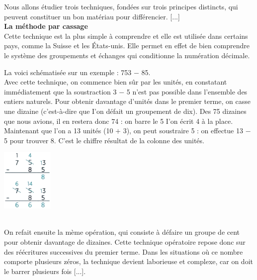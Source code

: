 \begin{center}
   \begin{minipage}{16cm}
      \textsf{Nous allons étudier trois techniques, fondées sur trois principes distincts, qui peuvent constituer un bon matériau pour différencier. [...] \\
      {\bf La méthode par \og cassage \fg} \\
      Cette technique est la plus simple à comprendre et elle est utilisée dans certains pays, comme la Suisse et les États-unis. Elle permet en effet de bien comprendre le système des groupements et échanges qui conditionne la numération décimale.} \\ [2mm]
      \begin{minipage}{13cm}
         \textsf{La voici schématisée sur un exemple : 753 $-$ 85. \\
         Avec cette technique, on commence bien sûr par les unités, en constatant immédiatement que la soustraction 3 $-$ 5 n'est pas possible dans l'ensemble des entiers naturels. Pour obtenir davantage d'unités dans le premier terme, on \og casse \fg{} une dizaine (c'est-à-dire que I'on défait un groupement de dix). Des 75 dizaines que nous avions, il en restera donc 74 : on barre le 5 I'on écrit 4 à la place. Maintenant que l'on a 13 unités (10 $+$ 3), on peut soustraire 5 : on effectue 13 $-$ 5 pour trouver 8. C'est le chiffre résultat de la colonne des unités. \medskip}
      \end{minipage}
      \quad
      \begin{minipage}{2.5cm}
               \includegraphics[width=2.5cm]{Nombres_et_calculs_did/Images/Num3_crpe_cassage}
      \end{minipage} \\
      \textsf{On refait ensuite la mème opération, qui consiste à défaire un groupe de cent pour obtenir davantage de dizaines. Cette technique opératoire repose donc sur des réécritures successives du premier terme. Dans les situations où ce nombre comporte plusieurs zéros, la technique devient laborieuse et complexe, car on doit le barrer plusieurs fois [...].}
   \end{minipage}


\end{center}
